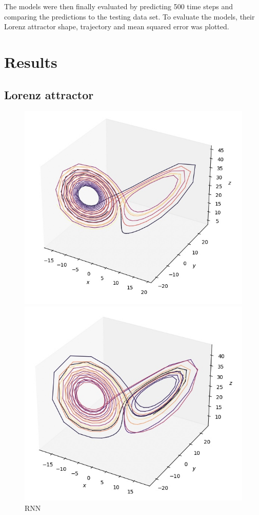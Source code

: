 \documentclass[11pt]{article}
\begin{document}
The models were then finally evaluated by predicting 500 time steps and comparing the predictions to the testing data set. To evaluate the models, their Lorenz attractor shape, trajectory and mean squared error was plotted.

\section{Results}
\subsection{Lorenz attractor}
\begin{figure}[ht]
    \centering
    \begin{minipage}{0.32\textwidth}
        \centering
        \includegraphics[width=\textwidth]{rnn_lorenz.jpeg}
        \caption{RNN}
    \end{minipage}\hfill
    \begin{minipage}{0.32\textwidth}
        \centering
        \includegraphics[width=\textwidth]{echo_lorenz.jpeg}

\end{minipage}
\end{figure}
\end{document}
